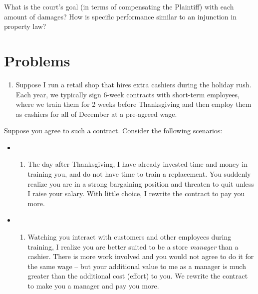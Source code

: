 \documentclass[
  11pt,
]{article}
\providecommand{\tightlist}{%
  \setlength{\itemsep}{0pt}\setlength{\parskip}{0pt}}
\begin{document}
What is the court's goal (in terms of compensating the Plaintiff) with
each amount of damages? How is specific performance similar to an
injunction in property law?

\clearpage

\hypertarget{problems}{%
\section{Problems}\label{problems}}

\begin{enumerate}
\def\labelenumi{\arabic{enumi}.}
\setcounter{enumi}{5}
\tightlist
\item
  Suppose I run a retail shop that hires extra cashiers during the
  holiday rush. Each year, we typically sign 6-week contracts with
  short-term employees, where we train them for 2 weeks before
  Thanksgiving and then employ them as cashiers for all of December at a
  pre-agreed wage.
\end{enumerate}

Suppose you agree to such a contract. Consider the following scenarios:

\begin{itemize}
\item
  \begin{enumerate}
  \def\labelenumi{(\roman{enumi})}
  \tightlist
  \item
    The day after Thanksgiving, I have already invested time and money
    in training you, and do not have time to train a replacement. You
    suddenly realize you are in a strong bargaining position and
    threaten to quit unless I raise your salary. With little choice, I
    rewrite the contract to pay you more.
  \end{enumerate}
\item
  \begin{enumerate}
  \def\labelenumi{(\roman{enumi})}
  \setcounter{enumi}{1}
  \tightlist
  \item
    Watching you interact with customers and other employees during
    training, I realize you are better suited to be a store
    \emph{manager} than a cashier. There is more work involved and you
    would not agree to do it for the same wage -- but your additional
    value to me as a manager is much greater than the additional cost
    (effort) to you. We rewrite the contract to make you a manager and
    pay you more.
  \end{enumerate}
\end{itemize}
\end{document}
